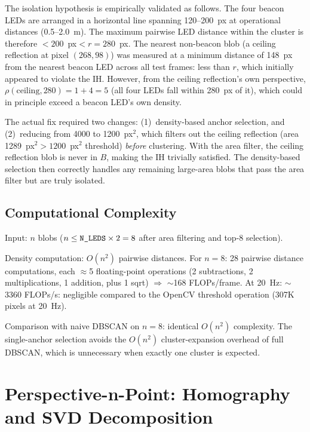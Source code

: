 The isolation hypothesis is empirically validated as follows. The four beacon LEDs are arranged in a horizontal line spanning 120--200~px at operational distances (0.5--2.0~m). The maximum pairwise LED distance within the cluster is therefore $<200$~px$<r=280$~px. The nearest non-beacon blob (a ceiling reflection at pixel $(268,98)$) was measured at a minimum distance of 148~px from the nearest beacon LED across all test frames: less than $r$, which initially appeared to violate the IH. However, from the ceiling reflection's own perspective, $\rho(\text{ceiling}, 280) = 1 + 4 = 5$ (all four LEDs fall within 280~px of it), which could in principle exceed a beacon LED's own density.

The actual fix required two changes: (1)~density-based anchor selection, and (2)~reducing  from 4000 to 1200~px$^2$, which filters out the ceiling reflection (area 1289~px$^2 > 1200$~px$^2$ threshold) \emph{before} clustering. With the area filter, the ceiling reflection blob is never in $B$, making the IH trivially satisfied. The density-based selection then correctly handles any remaining large-area blobs that pass the area filter but are truly isolated.

\subsection{Computational Complexity}

\begin{eqblock}
Input: $n$ blobs ($n \leq \code{N\_LEDS} \times 2 = 8$ after area filtering and top-8 selection).

Density computation: $O(n^2)$ pairwise distances. For $n=8$: 28 pairwise distance computations, each $\approx$5 floating-point operations (2 subtractions, 2 multiplications, 1 addition, plus 1 sqrt) $\Rightarrow$ $\sim$168 FLOPs/frame. At 20~Hz: $\sim$3360 FLOPs/s: negligible compared to the OpenCV threshold operation (307K pixels at 20~Hz).

Comparison with naive DBSCAN on $n=8$: identical $O(n^2)$ complexity. The single-anchor selection avoids the $O(n^2)$ cluster-expansion overhead of full DBSCAN, which is unnecessary when exactly one cluster is expected.
\end{eqblock}

\section{Perspective-n-Point: Homography and SVD Decomposition}

